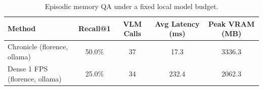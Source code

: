 \begin{table}[t]
  \centering
  \caption{Episodic memory QA under a fixed local model budget.}
  \label{tab:chronicle-vs-dense}
  \begin{tabular}{lcccc}
    \toprule
    Method & Recall@1 & VLM Calls & Avg Latency (ms) & Peak VRAM (MB) \\
    \midrule
    Chronicle (florence, ollama) & 50.0\% & 37 & 17.3 & 3336.3 \\
    Dense 1 FPS (florence, ollama) & 25.0\% & 34 & 232.4 & 2062.3 \\
    \bottomrule
  \end{tabular}
\end{table}
